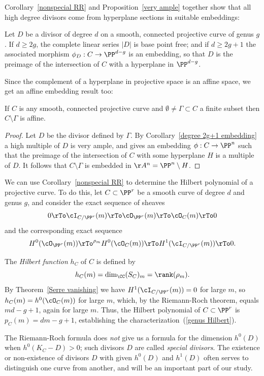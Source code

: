 Corollary~\ref{nonspecial RR} and Proposition~\ref{very ample} together show that all high degree divisors come from hyperplane sections in 
suitable embeddings:

\begin{corollary}\label{degree 2g+1 embedding}
Let $D$ be a divisor of degree $d$ on a smooth, connected projective curve of genus $g$. If $d \geq 2g$, the complete linear series $|D|$ is base point free; and if $d \geq 2g+1$ the associated morphism $\phi_D : C \to \PP^{d-g}$ is an embedding, so that
$D$ is the preimage of the intersection of $C$ with a hyperplane in $ \PP^{d-g}$.
\end{corollary}

Since the complement of a hyperplane in projective space is an affine space, we get an affine embedding result too:

\begin{corollary}
 If $C$ is any smooth, connected projective curve and $\emptyset \neq \Gamma \subset C$ a finite subset then $C \setminus \Gamma$ is affine.
\end{corollary}
\begin{proof}
Let $D$ be the divisor defined by $\Gamma$. By Corollary~\ref{degree 2g+1 embedding} a high multiple of $D$ is very ample,
and gives an embedding $\phi: C\to \PP^n$ such that the preimage of the intersection of $C$ with some hyperplane $H$
is a multiple of $D$. It follows that $C\setminus \Gamma$ is embedded in $\AA^n = \PP^n\setminus H$.
\end{proof}
 
We can  use Corollary~\ref{nonspecial RR} to determine the Hilbert polynomial of a projective curve. To do this, let $C \subset \PP^r$ be a smooth curve of degree $d$ and genus $g$, and consider the exact sequence of sheaves
$$
0 \rTo \cI_{C/\PP^r}(m) \rTo \cO_{\PP^r}(m) \rTo \cO_C(m) \rTo 0
$$
and the corresponding exact sequence
$$
 H^0(\cO_{\PP^r}(m)) \rTo^{\rho_m} H^0(\cO_C(m)) \rTo H^1(\cI_{C/\PP^r}(m)) \rTo 0.
$$

The \emph{Hilbert function} $h_C$ of $C$  is defined by
$$
h_C(m) = \dim_{\CC} (S_{C})_{m} = \rank(\rho_m).
$$
By Theorem~\ref{Serre vanishing} we have $H^1(\cI_{C/\PP^r}(m)) = 0$ for large $m$, so $h_{C}(m) = h^0(\cO_C(m))$ for large $m$, which, by the Riemann-Roch theorem, equals $md-g+1$, again for large $m$. Thus, the Hilbert polynomial of $C \subset \PP^r$ is $p_C(m) = dm-g+1$, establishing the characterization~(\ref{genus Hilbert}).
 
The Riemann-Roch formula does \emph{not} give us a formula for the dimension $h^0(D)$ when $h^0(K_C - D)>0$; such divisors $D$ are called \emph{special divisors}. The existence or non-existence of divisors $D$ with given $h^{0}(D)$ and $h^{1}(D)$ often serves to distinguish one curve from another, and will be an important part of our study.


